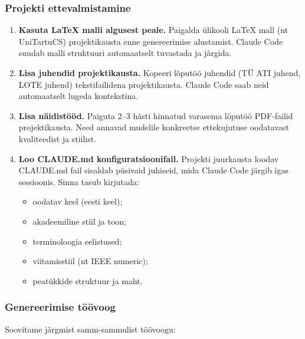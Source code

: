 \subsubsection{Projekti ettevalmistamine}

\begin{enumerate}
    \item \textbf{Kasuta \LaTeX{} malli algusest peale.} Paigalda ülikooli \LaTeX{} mall (nt UniTartuCS) projektikausta enne genereerimise alustamist. Claude Code suudab malli struktuuri automaatselt tuvastada ja järgida.
    \item \textbf{Lisa juhendid projektikausta.} Kopeeri lõputöö juhendid (TÜ ATI juhend, LOTE juhend) tekstifailidena projektikausta. Claude Code saab neid automaatselt lugeda kontekstina.
    \item \textbf{Lisa näidistööd.} Paiguta 2--3 hästi hinnatud varasema lõputöö PDF-failid projektikausta. Need annavad mudelile konkreetse ettekujutuse oodatavast kvaliteedist ja stiilist.
    \item \textbf{Loo CLAUDE.md konfiguratsioonifail.} Projekti juurkausta loodav CLAUDE.md fail sisaldab püsivaid juhiseid, mida Claude Code järgib igas sessioonis. Sinna tasub kirjutada:
    \begin{itemize}
        \item oodatav keel (eesti keel);
        \item akadeemiline stiil ja toon;
        \item terminoloogia eelistused;
        \item viitamisstiil (nt IEEE numeric);
        \item peatükkide struktuur ja maht.
    \end{itemize}
\end{enumerate}

\subsubsection{Genereerimise töövoog}

Soovitame järgmist samm-sammulist töövoogu:

